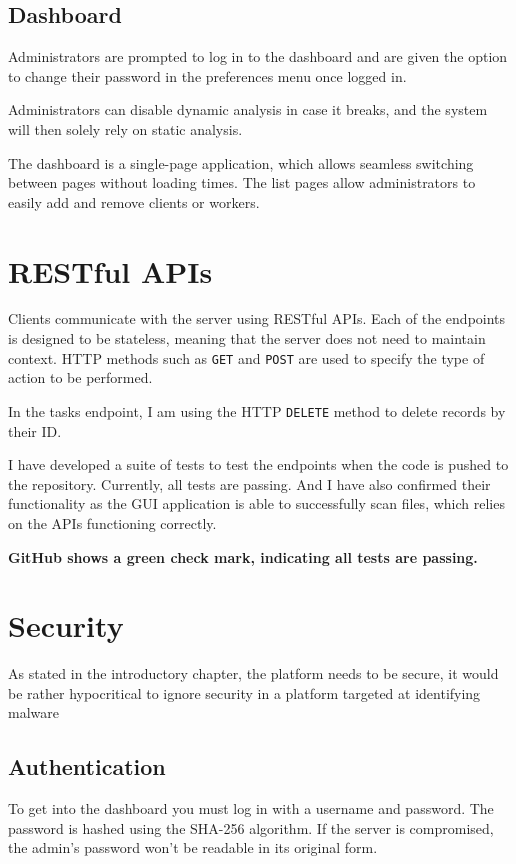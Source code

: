 \subsection{Dashboard}
Administrators are prompted to log in to the dashboard and are
given the option to change their password in the
preferences menu once logged in.

Administrators can disable dynamic analysis in case it breaks,
and the system will then solely rely on static analysis.

The dashboard is a single-page application,
which allows seamless switching between pages without loading times.
The list pages allow administrators to easily
add and remove clients or workers.

\section{RESTful APIs}
Clients communicate with the server using RESTful APIs.
Each of the endpoints is designed to be stateless,
meaning that the server does not need to maintain context.
HTTP methods such as \texttt{GET} and \texttt{POST} are used
to specify the type of action to be performed.

In the tasks endpoint, I am using the HTTP \texttt{DELETE}
method to delete records by their ID.

I have developed a suite of tests to test
the endpoints when the code is pushed to the repository.
Currently, all tests are passing. And I have also confirmed their functionality
as the GUI application is able to successfully scan files,
which relies on the APIs functioning correctly.

\textbf{GitHub shows a green check mark,
indicating all tests are passing.}

\section{Security}
As stated in the introductory chapter,
the platform needs to be secure,
it would be rather hypocritical to ignore security in a
platform targeted at identifying malware

\subsection{Authentication}
To get into the dashboard you must log in with a username and password.
The password is hashed using the SHA-256 algorithm.
If the server is compromised,
the admin's password won't be readable in its original form.

